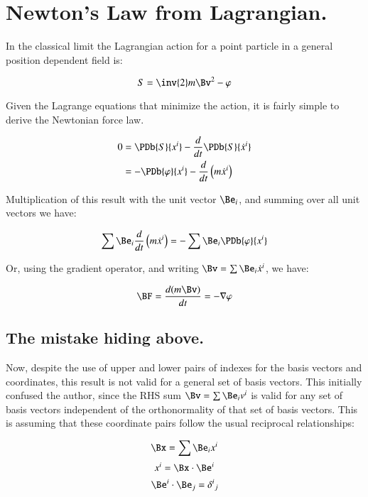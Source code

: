 \chapter{Newton's Law from Lagrangian.}
\label{chap:newtonianLagrangianAndGradient}
\date{August 9, 2008.  newtonianLagrangianAndGradient.tex}

In the classical limit the Lagrangian action for a point particle in a general
position dependent field is:

\begin{equation}
S = \inv{2} m\Bv^2 - \varphi
\end{equation}

Given the Lagrange equations that minimize the action, it is fairly simple
to derive the Newtonian force law.

\begin{align*}
0
&= \PDb{S}{x^i} - \frac{d}{dt}\PDb{S}{\dot{x}^i} \\
&= -\PDb{\varphi}{x^i} - \frac{d}{dt}\left(m \dot{x}^i\right)
\end{align*}

Multiplication of this result with the unit vector $\Be_i$, and summing over
all unit vectors we have:

\begin{equation*}
\sum \Be_i \frac{d}{dt}\left(m \dot{x}^i\right) = - \sum \Be_i \PDb{\varphi}{x^i}
\end{equation*}

Or, using the gradient operator, and writing $\Bv = \sum \Be_i \dot{x}^i$, we have:

\begin{equation}
\BF = \frac{d (m \Bv)}{dt} = - \grad \varphi
\end{equation}

\section{The mistake hiding above. }

Now, despite the use of upper and lower pairs of indexes for the basis vectors and coordinates, this
result is not valid for a general set of basis vectors.  This initially confused the author, since the RHS
sum $\Bv = \sum \Be_i v^i$ is valid for any set of basis vectors independent of the orthonormality of that
set of basis vectors.  This is assuming that these coordinate pairs follow the usual reciprocal relationships:

\begin{equation*}
\Bx = \sum \Be_i x^i
\end{equation*}
\begin{equation*}
x^i = \Bx \cdot \Be^i
\end{equation*}
\begin{equation*}
\Be^i \cdot \Be_j = {\delta^i}_j
\end{equation*}

